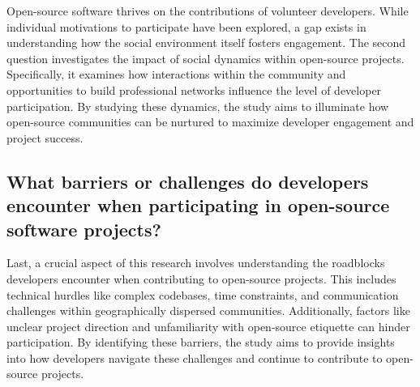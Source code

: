 Open-source software thrives on the contributions of volunteer developers. While individual motivations to participate have been explored, a gap exists in understanding how the social environment itself fosters engagement. The second question investigates the impact of social dynamics within open-source projects. Specifically, it examines how interactions within the community and opportunities to build professional networks influence the level of developer participation. By studying these dynamics, the study aims to illuminate how open-source communities can be nurtured to maximize developer engagement and project success.


\subsection{What barriers or challenges do developers encounter when participating in open-source software projects?}

Last, a crucial aspect of this research involves understanding the roadblocks developers encounter when contributing to open-source projects. This includes technical hurdles like complex codebases, time constraints, and communication challenges within geographically dispersed communities. Additionally, factors like unclear project direction and unfamiliarity with open-source etiquette can hinder participation. By identifying these barriers, the study aims to provide insights into how developers navigate these challenges and continue to contribute to open-source projects.


\clearpage  %
